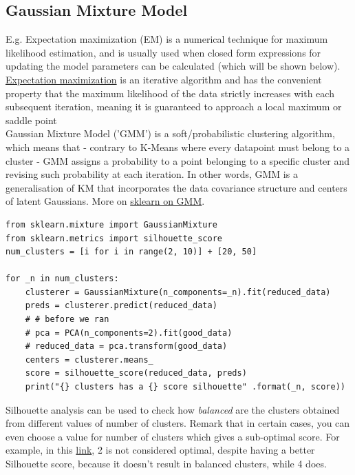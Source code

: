\documentclass[11pt]{article}
\begin{document}
\subsection{Gaussian Mixture Model}
E.g. Expectation maximization (EM) is a numerical technique for maximum likelihood estimation, and is usually used when closed form expressions for updating the model parameters can be calculated (which will be shown below). \href{http://home.deib.polimi.it/matteucc/Clustering/tutorial_html/mixture.html}{Expectation maximization} is an iterative algorithm and has the convenient property that the maximum likelihood of the data strictly increases with each subsequent iteration, meaning it is guaranteed to approach a local maximum or saddle point \\
Gaussian Mixture Model ('GMM') is a soft/probabilistic clustering algorithm, which means that - contrary to K-Means where every datapoint must belong to a cluster - GMM assigns a probability to a point belonging to a specific cluster and revising such probability at each iteration. In other words, GMM is a generalisation of KM that incorporates the data covariance structure and centers of latent Gaussians. More on \href{http://scikit-learn.org/stable/modules/mixture.html#expectation-maximization}{sklearn on GMM}.

\begin{lstlisting}
from sklearn.mixture import GaussianMixture
from sklearn.metrics import silhouette_score
num_clusters = [i for i in range(2, 10)] + [20, 50] 

for _n in num_clusters:
	clusterer = GaussianMixture(n_components=_n).fit(reduced_data)
	preds = clusterer.predict(reduced_data)
	# # before we ran
	# pca = PCA(n_components=2).fit(good_data)
	# reduced_data = pca.transform(good_data)
	centers = clusterer.means_
	score = silhouette_score(reduced_data, preds)
	print("{} clusters has a {} score silhouette" .format(_n, score)) 
\end{lstlisting}
Silhouette analysis can be used to check how \textit{balanced} are the clusters obtained from different values of number of clusters. Remark that in certain cases, you can even choose a value for number of clusters which gives a sub-optimal score. For example, in this \href{http://scikit-learn.org/stable/auto_examples/cluster/plot_kmeans_silhouette_analysis.html#sphx-glr-auto-examples-cluster-plot-kmeans-silhouette-analysis-py}{link}, 2 is not considered optimal, despite having a better Silhouette score, because it doesn't result in balanced clusters, while 4 does.
 
\end{document}
